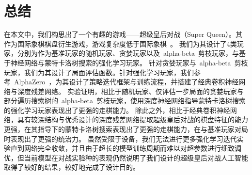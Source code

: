 \chapter{总结}
\label{chap:conclusion}
在本文中，我们构思出了一个有趣的游戏——超级皇后对战（Super Queen）。其作为国际象棋棋盘衍生游戏，游戏复杂度低于国际象棋~\cite{enwiki:complexity}。
我们为其设计了4类玩家，分别为作为基准玩家的随机玩家、贪婪玩家以及~alpha-beta~剪枝玩家，与基于神经网络与蒙特卡洛树搜索的强化学习玩家。
针对贪婪玩家与~alpha-beta~剪枝玩家，我们为其设计了局面评估函数。针对强化学习玩家，我们参考~AlphaZero~\cite{Silver1140,Silver2017,Silver2016}，为其设计了策略迭代框架与训练流程，并搭建了经典卷积神经网络与深度残差网络\cite{resnet}。
实验证明，相比于随机玩家、仅评估一步局面的贪婪玩家与部分遍历搜索树的~alpha-beta~剪枝玩家，使用深度神经网络指导蒙特卡洛树搜索的强化学习玩家表现出了更强的走棋能力。
除此之外，相比于经典卷积神经网络，具有较深结构与优秀设计的深度残差网络提取超级皇后对战的棋盘特征的能力更强，在其指导下的蒙特卡洛树搜索表现出了更强的走棋能力，在与基准玩家对局时表现出了更强的统治力。
虽然受限于设备，我们无法进行更多强化学习迭代实验直到网络完全收敛，并且由于超长的模型训练周期而难以对超参数进行细致调优，但当前模型在对战实验种的表现仍然说明了我们设计的超级皇后对战人工智能取得了较好的结果，较好地完成了设计目的。